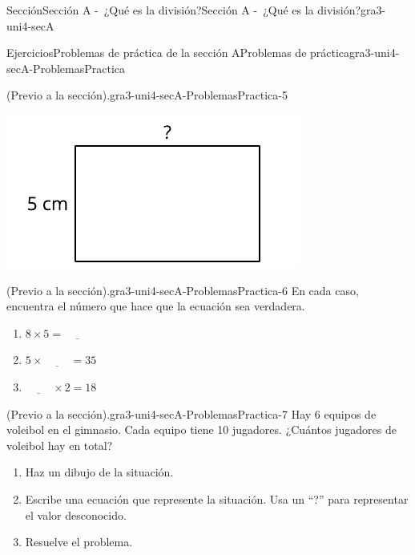 \documentclass[twoside,10pt,]{article}
\begin{document}
\begin{sectionptx}{Sección}{Sección A -~¿Qué es la división?}{}{Sección A -~¿Qué es la división?}{}{}{gra3-uni4-secA}
\begin{exercises-subsection}{Ejercicios}{Problemas de práctica de la sección A}{}{Problemas de práctica}{}{}{gra3-uni4-secA-ProblemasPractica}
\begin{divisionexercise}{3}{(Previo a la sección).}{}{gra3-uni4-secA-ProblemasPractica-5}
\begin{sidebyside}{2}{0}{0}{0}
\begin{sbspanel}{0.5}
\end{sbspanel}%
\begin{sbspanel}{0.5}%
\includegraphics[width=\linewidth]{external/svg-source/tikz-file-151673-scale13.pdf}
\end{sbspanel}%
\end{sidebyside}%
\end{divisionexercise}%
\begin{divisionexercise}{4}{(Previo a la sección).}{}{gra3-uni4-secA-ProblemasPractica-6}%
En cada caso, encuentra el número que hace que la ecuación sea verdadera.%
\par
%
\begin{enumerate}[label={(\alph*)}]
\item{}\(\displaystyle 8 \times 5 = \underline{\hspace{1cm}}\)%
\item{}\(\displaystyle 5 \times \underline{\hspace{1cm}} = 35\)%
\item{}\(\displaystyle \underline{\hspace{1cm}} \times 2 = 18\)%
\end{enumerate}
%
\end{divisionexercise}%
\begin{divisionexercise}{5}{(Previo a la sección).}{}{gra3-uni4-secA-ProblemasPractica-7}%
Hay 6 equipos de voleibol en el gimnasio. Cada equipo tiene 10 jugadores. ¿Cuántos jugadores de voleibol hay en total?%
\par
%
\begin{enumerate}[label={(\alph*)}]
\item{}Haz un dibujo de la situación.%
\item{}Escribe una ecuación que represente la situación. Usa un “?” para representar el valor desconocido.%
\item{}Resuelve el problema.%

\end{enumerate}
\end{divisionexercise}
\end{exercises-subsection}
\end{sectionptx}
\end{document}
